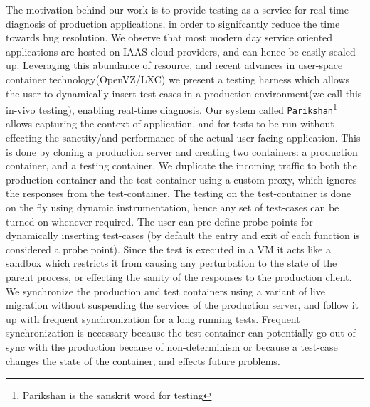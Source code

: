 The motivation behind our work is to provide testing as a service for real-time diagnosis of production applications, in order to signifcantly reduce the time towards bug resolution.
We observe that most modern day service oriented applications are hosted on IAAS cloud providers, and can hence be easily scaled  up. 
Leveraging this abundance of resource, and recent advances in user-space container technology(OpenVZ/LXC\cite{openvz,linux}) we present a testing harness which allows the user to dynamically insert test cases in a production environment(we call this in-vivo testing), enabling real-time diagnosis.
Our system called \texttt{Parikshan}\footnote{Parikshan is the sanskrit word for testing} allows capturing the context of application, and for tests to be run without effecting the sanctity/and performance of the actual user-facing application. 
This is done by cloning a production server and creating two containers: a production container, and a testing container. 
We duplicate the incoming traffic to both the production container and the test container using a custom proxy, which ignores the responses from the test-container. 
The testing on the test-container is done on the fly using dynamic instrumentation, hence any set of test-cases can be turned on whenever required. 
The user can pre-define probe points for dynamically inserting test-cases (by default the entry and exit of each function is considered a probe point).
Since the test is executed in a VM it acts like a sandbox which restricts it from causing any perturbation to the state of the parent process, or effecting the sanity of the responses to the production client. 
We synchronize the production and test containers using a variant of live migration without suspending the services of the production server, and follow it up with frequent synchronization for a long running tests. 
Frequent synchronization is necessary because the test container can potentially go out of sync with the production because of non-determinism or because a test-case changes the state of the container, and effects future problems. 

